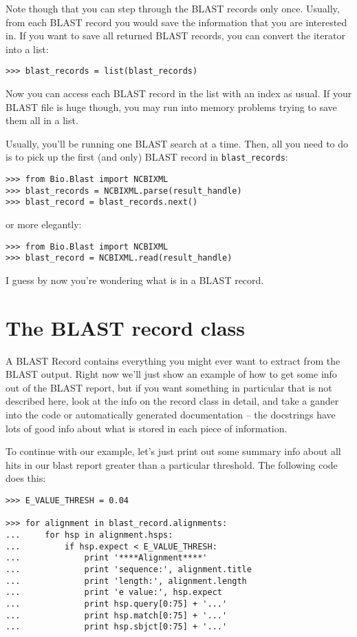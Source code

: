 \documentclass{report}
\begin{document}
Note though that you can step through the BLAST records only once.
Usually, from each BLAST record you would save the information that
you are interested in. If you want to save all returned BLAST records,
you can convert the iterator into a list:
\begin{verbatim}
>>> blast_records = list(blast_records)
\end{verbatim}
Now you can access each BLAST record in the list with an index as usual.
If your BLAST file is huge though, you may run into memory problems trying to
save them all in a list.

Usually, you'll be running one BLAST search at a time. Then, all you need
to do is to pick up the first (and only) BLAST record in \verb|blast_records|:
\begin{verbatim}
>>> from Bio.Blast import NCBIXML
>>> blast_records = NCBIXML.parse(result_handle)
>>> blast_record = blast_records.next()
\end{verbatim}
\noindent or more elegantly:
\begin{verbatim}
>>> from Bio.Blast import NCBIXML
>>> blast_record = NCBIXML.read(result_handle)
\end{verbatim}

I guess by now you're wondering what is in a BLAST record.

\section{The BLAST record class}

A BLAST Record contains everything you might ever want to extract from the
BLAST output. Right now we'll just show
an example of how to get some info out of the BLAST report, but if you
want something in particular that is not described here, look at the
info on the record class in detail, and take a gander into the code or
automatically generated documentation -- the docstrings have lots of
good info about what is stored in each piece of information.

To continue with our example, let's just print out some summary info
about all hits in our blast report greater than a particular
threshold. The following code does this:

\begin{verbatim}
>>> E_VALUE_THRESH = 0.04

>>> for alignment in blast_record.alignments:
...     for hsp in alignment.hsps:
...         if hsp.expect < E_VALUE_THRESH:
...             print '****Alignment****'
...             print 'sequence:', alignment.title
...             print 'length:', alignment.length
...             print 'e value:', hsp.expect
...             print hsp.query[0:75] + '...'
...             print hsp.match[0:75] + '...'
...             print hsp.sbjct[0:75] + '...'
\end{verbatim}
\end{document}
